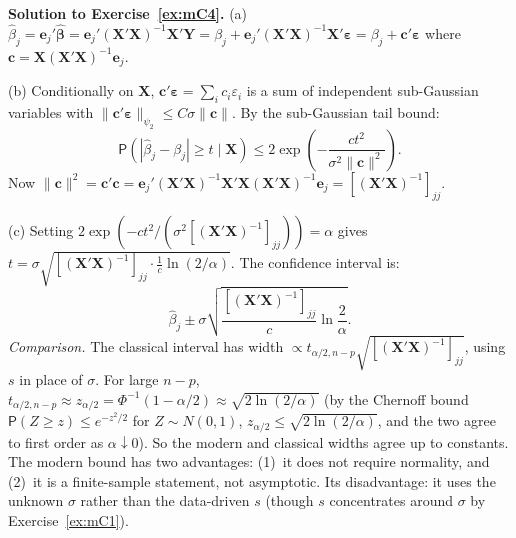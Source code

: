 \documentclass[14pt]{extarticle}
\theoremstyle{plain}
\theoremstyle{definition}
\theoremstyle{remark}
\newcommand\prb{\mathsf{P}}
\newcommand{\bX}{\mathbf{X}}
\newcommand{\bY}{\mathbf{Y}}
\newcommand{\be}{\boldsymbol{\varepsilon}}
\def\bc{\mathbf{c}}
\newcommand{\hbb}{\hat{\boldsymbol{\beta}}}
\begin{document}
\textbf{Solution to Exercise~\ref{ex:mC4}.} (a) $\hat\beta_j = \mathbf{e}_j'\hbb = \mathbf{e}_j'(\bX'\bX)^{-1}\bX'\bY = \beta_j + \mathbf{e}_j'(\bX'\bX)^{-1}\bX'\be = \beta_j + \bc'\be$ where $\bc = \bX(\bX'\bX)^{-1}\mathbf{e}_j$.

(b) Conditionally on $\bX$, $\bc'\be = \sum_i c_i\varepsilon_i$ is a sum of independent sub-Gaussian variables with $\|\bc'\be\|_{\psi_2} \leqslant C\sigma\|\bc\|$. By the sub-Gaussian tail bound:
\[
\prb(|\hat\beta_j - \beta_j| \geqslant t \mid \bX) \leqslant 2\exp\!\left(-\frac{ct^2}{\sigma^2\|\bc\|^2}\right).
\]
Now $\|\bc\|^2 = \bc'\bc = \mathbf{e}_j'(\bX'\bX)^{-1}\bX'\bX(\bX'\bX)^{-1}\mathbf{e}_j = [(\bX'\bX)^{-1}]_{jj}$.

(c) Setting $2\exp(-ct^2/(\sigma^2[(\bX'\bX)^{-1}]_{jj})) = \alpha$ gives $t = \sigma\sqrt{[(\bX'\bX)^{-1}]_{jj}\cdot\frac{1}{c}\ln(2/\alpha)}$. The confidence interval is:
\[
\hat\beta_j \pm \sigma\sqrt{\frac{[(\bX'\bX)^{-1}]_{jj}}{c}\ln\frac{2}{\alpha}}.
\]
\emph{Comparison.} The classical interval has width $\propto t_{\alpha/2,n-p}\sqrt{[(\bX'\bX)^{-1}]_{jj}}$, using $s$ in place of $\sigma$. For large $n-p$, $t_{\alpha/2,n-p} \approx z_{\alpha/2} = \Phi^{-1}(1-\alpha/2) \approx \sqrt{2\ln(2/\alpha)}$ (by the Chernoff bound $\prb(Z \geqslant z) \leqslant e^{-z^2/2}$ for $Z \sim N(0,1)$, $z_{\alpha/2} \leqslant \sqrt{2\ln(2/\alpha)}$, and the two agree to first order as $\alpha \downarrow 0$). So the modern and classical widths agree up to constants. The modern bound has two advantages: (1)~it does not require normality, and (2)~it is a finite-sample statement, not asymptotic. Its disadvantage: it uses the unknown $\sigma$ rather than the data-driven $s$ (though $s$ concentrates around $\sigma$ by Exercise~\ref{ex:mC1}).
\end{document}
